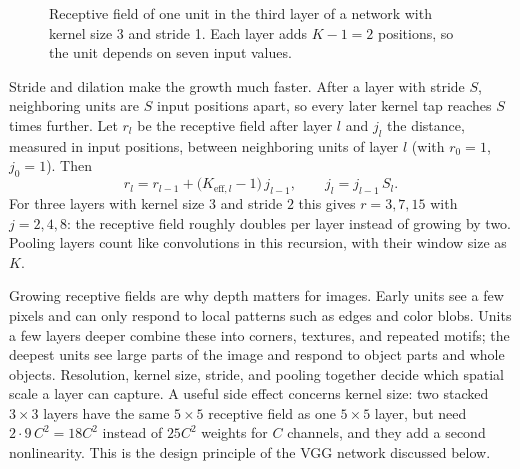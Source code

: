 \begin{figure}[ht]
  \centering
  \caption{Receptive field of one unit in the third layer of a network with
  kernel size 3 and stride 1. Each layer adds $K-1=2$ positions, so the unit
  depends on seven input values.}
  \label{fig:receptive-field}
\end{figure}

\noindent
Stride and dilation make the growth much faster. After a layer with stride $S$,
neighboring units are $S$ input positions apart, so every later kernel tap
reaches $S$ times further. Let $r_l$ be the receptive field after layer $l$ and
$j_l$ the distance, measured in input positions, between neighboring units of
layer $l$ (with $r_0 = 1$, $j_0 = 1$). Then
\begin{equation}
  r_l = r_{l-1} + \bigl(K_{\mathrm{eff},l} - 1\bigr)\, j_{l-1},
  \qquad
  j_l = j_{l-1}\, S_l .
  \label{eq:receptive-field}
\end{equation}
\noindent
For three layers with kernel size $3$ and stride $2$ this gives
$r = 3, 7, 15$ with $j = 2, 4, 8$: the receptive field roughly doubles per layer
instead of growing by two. Pooling layers count like convolutions in this
recursion, with their window size as $K$.

Growing receptive fields are why depth matters for images. Early units see a few
pixels and can only respond to local patterns such as edges and color blobs.
Units a few layers deeper combine these into corners, textures, and repeated
motifs; the deepest units see large parts of the image and respond to object
parts and whole objects. Resolution, kernel size, stride, and pooling together
decide which spatial scale a layer can capture. A useful side effect concerns
kernel size: two stacked $3\times3$ layers have the same $5\times5$ receptive
field as one $5\times5$ layer, but need $2\cdot9\,C^2 = 18C^2$ instead of $25C^2$
weights for $C$ channels, and they add a second nonlinearity. This is the design
principle of the VGG network discussed below.

